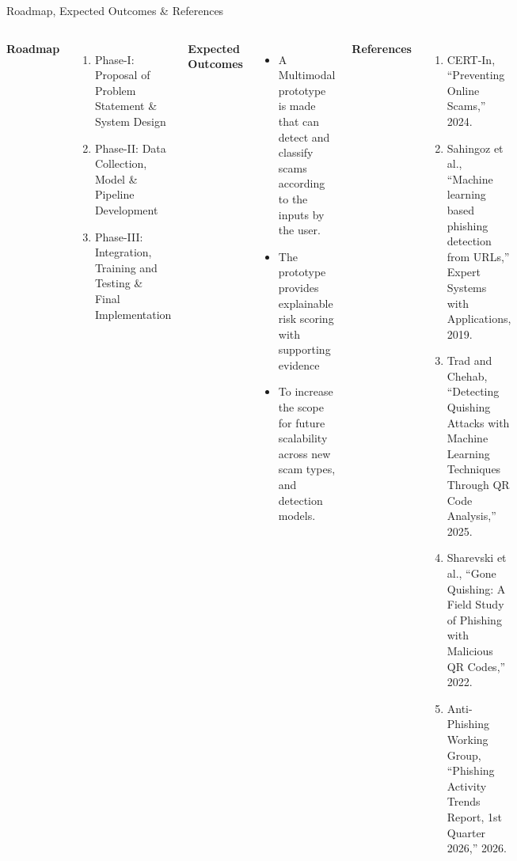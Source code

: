 \documentclass[aspectratio=169,11pt]{beamer}
\begin{document}
\begin{frame}{Roadmap, Expected Outcomes \& References}

\scriptsize

\begin{columns}[T,totalwidth=\textwidth]


\textbf{\color{GEUBlue}Roadmap}

\begin{enumerate}\itemsep2pt \parskip0pt
\item Phase-I: Proposal of Problem Statement \& System Design
\item Phase-II: Data Collection, Model \& Pipeline Development
\item Phase-III: Integration, Training and Testing \& Final Implementation
\end{enumerate}

\vspace{2mm}

\textbf{\color{GEUBlue}Expected Outcomes}

\begin{itemize}\itemsep2pt \parskip0pt
\item A Multimodal prototype is made that can detect and classify scams according to the inputs by the user.
\item The prototype provides explainable risk scoring with supporting evidence  
\item To increase the scope for future scalability across
      new scam types, and detection models.
\end{itemize}


{\tiny
\textbf{\color{GEUBlue}References}

\vspace{1mm}

\begin{enumerate}\itemsep1pt \parskip0pt
\item CERT-In, ``Preventing Online Scams,'' 2024.
\item Sahingoz et al., ``Machine learning based phishing detection from URLs,''
      Expert Systems with Applications, 2019.
\item Trad and Chehab, ``Detecting Quishing Attacks with Machine Learning
      Techniques Through QR Code Analysis,'' 2025.
\item Sharevski et al., ``Gone Quishing: A Field Study of Phishing with
      Malicious QR Codes,'' 2022.
\item Anti-Phishing Working Group, ``Phishing Activity Trends Report,
      1st Quarter 2026,'' 2026.
\end{enumerate}
}


\end{columns}
\end{frame}
\end{document}
